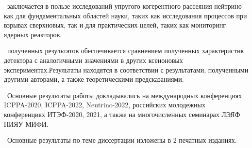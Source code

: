 \influence\ заключается в пользе исследований упругого когерентного рассеяния нейтрино как для фундаментальных областей науки, таких как исследования процессов при взрывах сверхновых, так и для практических целей, таких как мониторинг ядерных реакторов.

\reliability\ полученных результатов обеспечивается сравнением полученных характеристик детектора с аналогичными значениями в других ксеноновых экспериментах.Результаты находятся в соответствии с результатами, полученными другими авторами, а также теоретическими предсказаниями.

\probation\
Основные результаты работы докладывались на международных конференциях ICPPA-2020, ICPPA-2022, Neutrino-2022, российских молодежных конференциях ИТЭФ-2020, 2021, а также на многочисленных семинарах ЛЭЯФ НИЯУ МИФИ. 



\publications\ Основные результаты по теме диссертации изложены в 2 печатных изданиях.%
    


